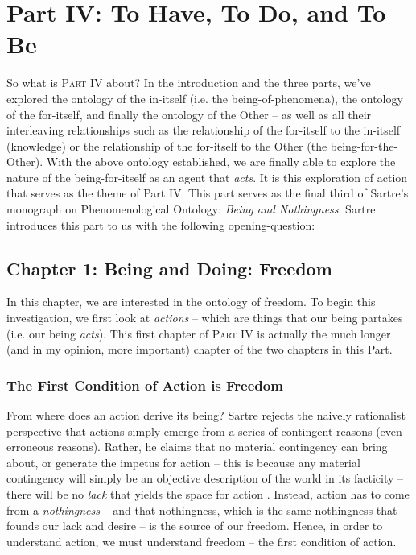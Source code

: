 \chapter{Part IV: To Have, To Do, and To Be}

So what is \textsc{Part IV} about? In the introduction and the three parts, we've explored the ontology of the in-itself (i.e. the being-of-phenomena), the ontology of the for-itself, and finally the ontology of the Other -- as well as all their interleaving relationships such as the relationship of the for-itself to the in-itself (knowledge) or the relationship of the for-itself to the Other (the being-for-the-Other). With the above ontology established, we are finally able to explore the nature of the being-for-itself as an agent that \emph{acts}. It is this exploration of action that serves as the theme of Part IV. This part serves as the final third of Sartre's monograph on Phenomenological Ontology: \emph{Being and Nothingness}. Sartre introduces this part to us with the following opening-question:


\section{Chapter 1: Being and Doing: Freedom}

In this chapter, we are interested in the ontology of freedom. To begin this investigation, we first look at \emph{actions} -- which are things that our being partakes (i.e. our being \emph{acts}). This first chapter of \textsc{Part IV} is actually the much longer (and in my opinion, more important) chapter of the two chapters in this Part.

\subsection{The First Condition of Action is Freedom}

From where does an action derive its being? Sartre rejects the naively rationalist perspective that actions simply emerge from a series of contingent reasons (even erroneous reasons). Rather, he claims that no material contingency can bring about, or generate the impetus for action -- this is because any material contingency will simply be an objective description of the world in its facticity -- there will be no \emph{lack} that yields the space for action \autocite[574]{sartre}. Instead, action has to come from a \emph{nothingness} -- and that nothingness, which is the same nothingness that founds our lack and desire -- is the source of our freedom. Hence, in order to understand action, we must understand freedom -- the first condition of action.

